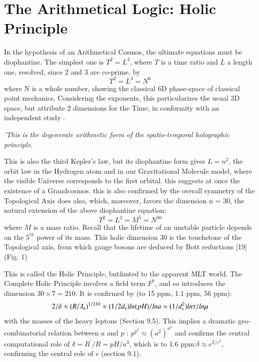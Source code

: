 \documentclass[twoside,draft]{article}
\begin{document}
\begin{sloppypar}
\section{The Arithmetical Logic: Holic Principle}

In the hypothesis of an Arithmetical Cosmos, the ultimate equations must be diophantine. The
simplest one is $T^{2} = L^{3}$, where $T$ is a time ratio and $L$ a length one, resolved, since 2 and 3 are 
co-prime, by $$T^{2} = L^{3} = N^{6}$$ where N is a whole number, showing the classical 6D phase-space of classical point mechanics. Considering the exponents, this particularizes the usual 3D space, but attribute 2 dimensions for the Time, in conformity with an independent study \cite{Bars}.

\textit{'This is the degenerate arithmetic form of the spatio-temporal holographic principle}.

This is also the third Kepler's law, but its diophantine form gives $L = n^{2}$, the orbit law in the Hydrogen atom and in our
Gravitational Molecule model, where the visible Universe corresponds to the first orbital. this suggests at once the existence of a Grandcosmos. this is also confirmed by the overall symmetry of the Topological Axis does also, which, moreover, favors the
dimension n = 30, the natural extension of the above diophantine equation:
\begin{equation}
T^{2} = L^{3} = M^{5} = N^{30}
\end{equation}
where $M$ is a mass ratio. Recall that the lifetime of an unstable particle depends on the $5^{th}$ power of its mass. This holic dimension 30 is the touchstone of the Topological axis, from which gauge bosons are deduced by Bott reductions [19] (Fig. 1)

This is called the Holic Principle, butlimted to the apparent MLT world. The Complete Holic
Principle \cite{Sanchez4} involves a field term $F^{7}$, and so introduces the dimension $30 \times 7 = 210$. It is confirmed by (to 15 ppm, 1.1 ppm, 56 ppm):
$$2/\delta \approx (R/\lambdabar_{e})^{1/210} \approx (1/2d_{e}) ln(pH)/lna \approx (1/d_e^{2})ln\tau/ln\mu$$
with the masses of the heavy leptons (Section 9.5). This implies a dramatic geo-combinatorial relation between $a$ and $p$ : $p^{p^{2}} \approx (a^{2})^{a^{3}}$ and confirms the central computational role of $\delta = R^{\prime}/R = pH/a^{3}$, which is to 1.6 ppm:$\delta \approx e^{2/e^2}$, confirming the central role of $e$ (section 9.1).


\end{sloppypar}
\end{document}
